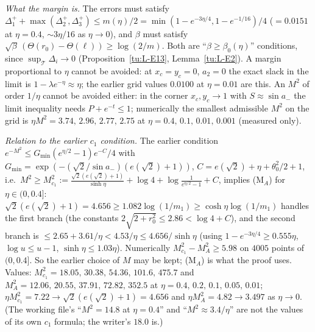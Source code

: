 \noindent\emph{What the margin is.} The errors must satisfy $\Delta_1^++\max(\Delta_2^+,\Delta_3^+)\le m(\eta)/2
=\min(1-e^{-3\eta/4},1-e^{-1/16})/4$ ($=0.0151$ at $\eta=0.4$, $\sim3\eta/16$ as $\eta\to0$), and $\beta$ must satisfy
$\sqrt\beta\,(\Theta(r_0)-\Theta(\ell))\ge\log(2/m)$. Both are ``$\beta\ge\beta_0(\eta)$'' conditions, since $\sup_{\mathcal T}\Delta_i\to0$
(Proposition~\ref{tu:L-E13}, Lemma~\ref{tu:L-E2}). A margin proportional to $\eta$ cannot be avoided: at $x_c=y_c=0$, $a_2=0$ the
exact slack in the limit is $1-\lambda e^{-\eta}\approx\eta$; the earlier grid values $0.0100$ at $\eta=0.01$ are this.
An $M^2$ of order $1/\eta$ cannot be avoided either: in the corner $x_c,y_c\to1$ with $S\approx\sin a_-$ the limit inequality
needs $P+e^{-t}\le1$; numerically the smallest admissible $M^2$ on the grid is $\eta M^2=3.74,\,2.96,\,2.77,\,2.75$ at
$\eta=0.4,\,0.1,\,0.01,\,0.001$ (measured only).

\noindent\emph{Relation to the earlier $c_1$ condition.} The earlier condition $e^{-M^2}\le G_{\min}(e^{\eta/2}-1)e^{-C}/4$ with
$G_{\min}=\exp(-(\sqrt2/\sin a_-)(e(\sqrt2)+1))$, $C=e(\sqrt2)+\eta+\theta_0^2/2+1$, i.e.\
$M^2\ge M_{c_1}^2:=\frac{\sqrt2(e(\sqrt2)+1)}{\sinh\eta}+\log4+\log\frac1{e^{\eta/2}-1}+C$, implies (M$_A$) for $\eta\in(0,0.4]$:
$\sqrt2(e(\sqrt2)+1)=4.656\ge1.082\log(1/m_1)\ge\cosh\eta\log(1/m_1)$ handles the first branch (the constants
$2\sqrt{2+r_0^2}\le2.86<\log4+C$), and the second branch is $\le2.65+3.61/\eta<4.53/\eta\le4.656/\sinh\eta$ (using
$1-e^{-3\eta/4}\ge0.555\eta$, $\log u\le u-1$, $\sinh\eta\le1.03\eta$). Numerically $M_{c_1}^2-M_A^2\ge5.98$ on $4005$ points
of $(0,0.4]$. So the earlier choice of $M$ may be kept; (M$_A$) is what the proof uses. Values:
$M_{c_1}^2=18.05,\,30.38,\,54.36,\,101.6,\,475.7$ and $M_A^2=12.06,\,20.55,\,37.91,\,72.82,\,352.5$ at
$\eta=0.4,\,0.2,\,0.1,\,0.05,\,0.01$; $\eta M_{c_1}^2=7.22\to\sqrt2(e(\sqrt2)+1)=4.656$ and $\eta M_A^2=4.82\to3.497$ as
$\eta\to0$. (The working file's ``$M^2=14.8$ at $\eta=0.4$'' and ``$M^2\approx3.4/\eta$'' are not the values of its own $c_1$
formula; the writer's $18.0$ is.)
